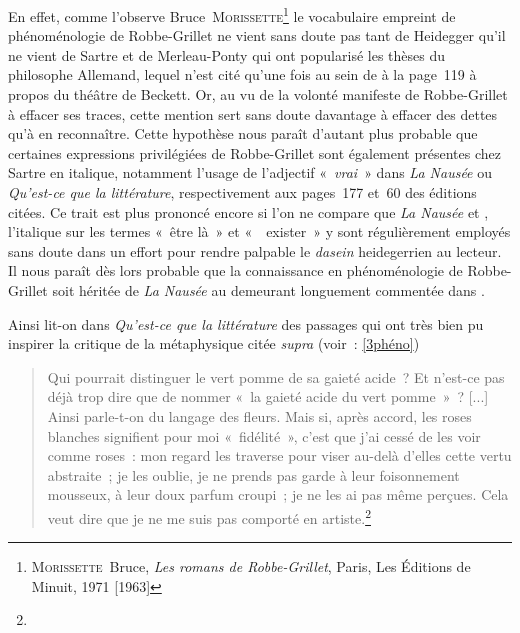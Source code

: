 \documentclass[12pt, a4paper]{article}
\begin{document}
En effet, comme l'observe Bruce~\textsc{Morissette}\footnote{\textsc{Morissette}~Bruce, \textit{Les romans de Robbe-Grillet}, Paris, Les Éditions de Minuit, 1971 [1963]%
} le vocabulaire empreint de phénoménologie de Robbe-Grillet ne vient sans doute pas tant de Heidegger qu'il ne vient de Sartre et de Merleau-Ponty qui ont popularisé les thèses du philosophe Allemand, lequel n'est cité qu'une fois au sein de \punr{} à la page~119 à propos du théâtre de Beckett. Or, au vu de la volonté manifeste de Robbe-Grillet à effacer ses traces, cette mention sert sans doute davantage à effacer des dettes qu'à en reconnaître. Cette hypothèse nous paraît d'autant plus probable que certaines expressions privilégiées de Robbe-Grillet sont également présentes chez Sartre en italique, notamment l'usage de l'adjectif «~\textit{vrai}~» dans \textit{La Nausée} ou \textit{Qu'est-ce que la littérature}, respectivement aux pages~177 et~60 des éditions citées. Ce trait est plus prononcé encore si l'on ne compare que \textit{La Nausée} et \punr, l'italique sur les termes «~être là~» et «~~exister~» y sont régulièrement employés sans doute dans un effort pour rendre palpable le \textit{dasein} heidegerrien au lecteur. Il nous paraît dès lors probable que la connaissance en phénoménologie de Robbe-Grillet soit héritée de \textit{La Nausée} au demeurant longuement commentée dans \punr.

Ainsi lit-on dans \textit{Qu'est-ce que la littérature} des passages qui ont très bien pu inspirer la critique de la métaphysique citée \textit{supra} (voir~: \ref{3phéno})
\begin{quote}
    Qui pourrait distinguer le vert pomme de sa gaieté acide~? Et n'est-ce pas déjà trop dire que de nommer «~la gaieté acide du vert pomme~»~? [...] Ainsi parle-t-on du langage des fleurs. Mais si, après accord, les roses blanches signifient pour moi «~fidélité~», c'est que j'ai cessé de les voir comme roses~: mon regard les traverse pour viser au-delà d'elles cette vertu abstraite~; je les oublie, je ne prends pas garde à leur foisonnement mousseux, à leur doux parfum croupi~; je ne les ai pas même perçues. Cela veut dire que je ne me suis pas comporté en artiste.\footnote{}
\end{quote}
\end{document}

